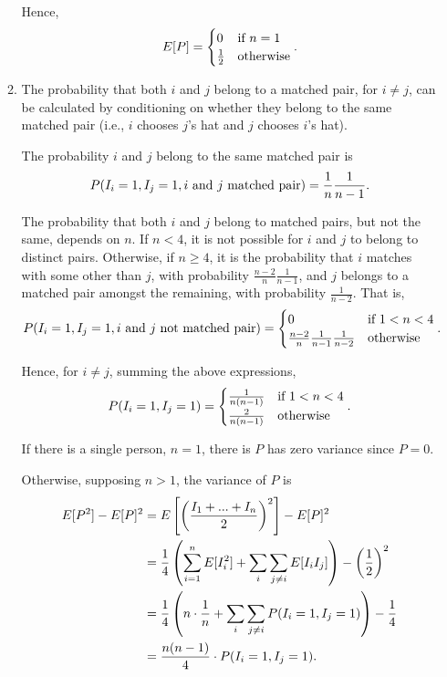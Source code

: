 \documentclass{article}
\begin{document}
\begin{enumerate}
\begin{enumerate}
        Hence,
        \[ E[P] =
            \begin{cases}
                0 & \text{if } n=1 \\
                \frac{1}{2} & \text{otherwise}
            \end{cases} \text.
        \]
    \item
        The probability that both $i$ and $j$ belong to a matched pair, for $i \neq j$, can be calculated by conditioning
        on whether they belong to the same matched pair (i.e., $i$ chooses $j$'s hat and $j$ chooses $i$'s hat).

        The probability $i$ and $j$ belong to the same matched pair is
        \[ P(I_i=1,I_j=1,i \text{ and } j \text{ matched pair}) = \frac{1}{n}\frac{1}{n-1} \text. \]

        The probability that both $i$ and $j$ belong to matched pairs, but not the same, depends on $n$. If $n<4$,
        it is not possible for $i$ and $j$ to belong to distinct pairs. Otherwise, if $n \geq 4$, it
        is the probability that $i$ matches with some other than $j$, with probability $\frac{n-2}{n}\frac{1}{n-1}$,
        and $j$ belongs to a matched pair amongst the remaining, with probability $\frac{1}{n-2}$. That is,
        \[ P(I_i=1,I_j=1,i \text{ and } j \text{ not matched pair}) =
                \begin{cases}
                    0 & \text{if } 1 < n < 4 \\
                    \frac{n-2}{n}\frac{1}{n-1}\frac{1}{n-2} & \text{otherwise}
                \end{cases} \text.
        \]

        Hence, for $i \neq j$, summing the above expressions,
        \[ P(I_i=1,I_j=1) =
                \begin{cases}
                    \frac{1}{n(n-1)} & \text{if } 1<n<4 \\
                    \frac{2}{n(n-1)} & \text{otherwise}
                \end{cases} \text.
        \]

        If there is a single person, $n=1$, there is $P$ has zero variance since $P=0$.

        Otherwise, supposing $n>1$, the variance of $P$ is
        \[\begin{split}
        E[P^2] - E[P]^2 & = E\left[\left(\frac{I_1 + ... + I_n}{2}\right)^2\right] - E[P]^2 \\
                        & = \frac{1}{4}\left( \sum_{i=1}^n E[I_i^2] + \sum_i\sum_{j \neq i}E[I_iI_j] \right) - \left(\frac{1}{2}\right)^2 \\
                        & = \frac{1}{4}\left( n\cdot\frac{1}{n} + \sum_i\sum_{j \neq i}P(I_i=1,I_j=1) \right) - \frac{1}{4} \\
                        & = \frac{n(n-1)}{4}\cdot P(I_i=1,I_j=1) \text. \\
        \end{split}\]


\end{enumerate}
\end{enumerate}
\end{document}
